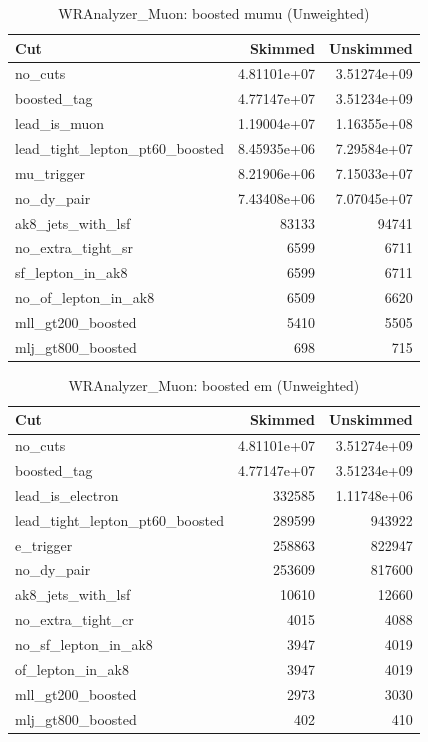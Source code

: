 \documentclass{article}
\begin{document}
\begin{table}[htbp]
\centering
\caption{WRAnalyzer\_Muon: boosted mumu (Unweighted)}
\begin{tabular}{lrr}
\hline
Cut & Skimmed & Unskimmed \\
\hline
no\_cuts & 4.81101e+07 & 3.51274e+09 \\
boosted\_tag & 4.77147e+07 & 3.51234e+09 \\
lead\_is\_muon & 1.19004e+07 & 1.16355e+08 \\
lead\_tight\_lepton\_pt60\_boosted & 8.45935e+06 & 7.29584e+07 \\
mu\_trigger & 8.21906e+06 & 7.15033e+07 \\
no\_dy\_pair & 7.43408e+06 & 7.07045e+07 \\
ak8\_jets\_with\_lsf & 83133 & 94741 \\
no\_extra\_tight\_sr & 6599 & 6711 \\
sf\_lepton\_in\_ak8 & 6599 & 6711 \\
no\_of\_lepton\_in\_ak8 & 6509 & 6620 \\
mll\_gt200\_boosted & 5410 & 5505 \\
mlj\_gt800\_boosted & 698 & 715 \\
\hline
\end{tabular}
\end{table}

\begin{table}[htbp]
\centering
\caption{WRAnalyzer\_Muon: boosted em (Unweighted)}
\begin{tabular}{lrr}
\hline
Cut & Skimmed & Unskimmed \\
\hline
no\_cuts & 4.81101e+07 & 3.51274e+09 \\
boosted\_tag & 4.77147e+07 & 3.51234e+09 \\
lead\_is\_electron & 332585 & 1.11748e+06 \\
lead\_tight\_lepton\_pt60\_boosted & 289599 & 943922 \\
e\_trigger & 258863 & 822947 \\
no\_dy\_pair & 253609 & 817600 \\
ak8\_jets\_with\_lsf & 10610 & 12660 \\
no\_extra\_tight\_cr & 4015 & 4088 \\
no\_sf\_lepton\_in\_ak8 & 3947 & 4019 \\
of\_lepton\_in\_ak8 & 3947 & 4019 \\
mll\_gt200\_boosted & 2973 & 3030 \\
mlj\_gt800\_boosted & 402 & 410 \\
\hline
\end{tabular}
\end{table}
\end{document}
